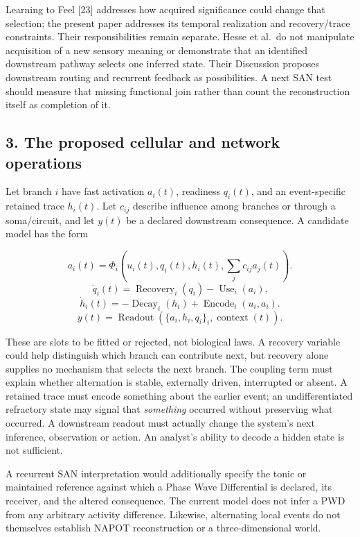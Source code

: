 \documentclass[
  american,
  11pt,
  letterpaper,
]{article}
\begin{document}
Learning to Feel {[}23{]} addresses how acquired significance could change that selection; the present paper addresses its temporal realization and recovery/trace constraints. Their responsibilities remain separate. Hesse et al.~do not manipulate acquisition of a new sensory meaning or demonstrate that an identified downstream pathway selects one inferred state. Their Discussion proposes downstream routing and recurrent feedback as possibilities. A next SAN test should measure that missing functional join rather than count the reconstruction itself as completion of it.

\subsection{3. The proposed cellular and network operations}\label{the-proposed-cellular-and-network-operations}

Let branch \(i\) have fast activation \(a_i(t)\), readiness \(q_i(t)\), and an event-specific retained trace \(h_i(t)\). Let \(c_{ij}\) describe influence among branches or through a soma/circuit, and let \(y(t)\) be a declared downstream consequence. A candidate model has the form

\[
a_i(t)=\Phi_i\!\left(u_i(t),q_i(t),h_i(t),\sum_j c_{ij}a_j(t)\right).
\tag{1}
\] \[
\dot q_i(t)=\operatorname{Recovery}_i(q_i)-\operatorname{Use}_i(a_i).
\tag{2}
\] \[
\dot h_i(t)=-\operatorname{Decay}_i(h_i)+\operatorname{Encode}_i(u_i,a_i).
\tag{3}
\] \[
y(t)=\operatorname{Readout}\!\left(\{a_i,h_i,q_i\}_i,\operatorname{context}(t)\right).
\tag{4}
\]

These are slots to be fitted or rejected, not biological laws. A recovery variable could help distinguish which branch can contribute next, but recovery alone supplies no mechanism that selects the next branch. The coupling term must explain whether alternation is stable, externally driven, interrupted or absent. A retained trace must encode something about the earlier event; an undifferentiated refractory state may signal that \emph{something} occurred without preserving what occurred. A downstream readout must actually change the system's next inference, observation or action. An analyst's ability to decode a hidden state is not sufficient.

A recurrent SAN interpretation would additionally specify the tonic or maintained reference against which a Phase Wave Differential is declared, its receiver, and the altered consequence. The current model does not infer a PWD from any arbitrary activity difference. Likewise, alternating local events do not themselves establish NAPOT reconstruction or a three-dimensional world.
\end{document}
